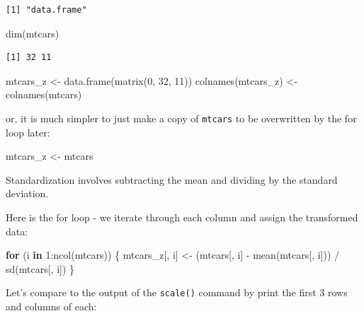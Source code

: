 \documentclass[
]{book}
\newenvironment{Shaded}{\begin{snugshade}}{\end{snugshade}}
\newcommand{\ControlFlowTok}[1]{\textcolor[rgb]{0.13,0.29,0.53}{\textbf{#1}}}
\newcommand{\DecValTok}[1]{\textcolor[rgb]{0.00,0.00,0.81}{#1}}
\newcommand{\FunctionTok}[1]{\textcolor[rgb]{0.00,0.00,0.00}{#1}}
\newcommand{\NormalTok}[1]{#1}
\newcommand{\OtherTok}[1]{\textcolor[rgb]{0.56,0.35,0.01}{#1}}
\newcommand{\SpecialCharTok}[1]{\textcolor[rgb]{0.00,0.00,0.00}{#1}}
\begin{document}
\begin{verbatim}
[1] "data.frame"
\end{verbatim}

\begin{Shaded}
\begin{Highlighting}[]
\FunctionTok{dim}\NormalTok{(mtcars)}
\end{Highlighting}
\end{Shaded}

\begin{verbatim}
[1] 32 11
\end{verbatim}

\begin{Shaded}
\begin{Highlighting}[]
\NormalTok{mtcars\_z }\OtherTok{\textless{}{-}} \FunctionTok{data.frame}\NormalTok{(}\FunctionTok{matrix}\NormalTok{(}\DecValTok{0}\NormalTok{, }\DecValTok{32}\NormalTok{, }\DecValTok{11}\NormalTok{))}
\FunctionTok{colnames}\NormalTok{(mtcars\_z) }\OtherTok{\textless{}{-}} \FunctionTok{colnames}\NormalTok{(mtcars)}
\end{Highlighting}
\end{Shaded}

or, it is much simpler to just make a copy of \texttt{mtcars} to be overwritten by the for loop later:

\begin{Shaded}
\begin{Highlighting}[]
\NormalTok{mtcars\_z }\OtherTok{\textless{}{-}}\NormalTok{ mtcars}
\end{Highlighting}
\end{Shaded}

Standardization involves subtracting the mean and dividing by the standard deviation.

Here is the for loop - we iterate through each column and assign the transformed data:

\begin{Shaded}
\begin{Highlighting}[]
\ControlFlowTok{for}\NormalTok{ (i }\ControlFlowTok{in} \DecValTok{1}\SpecialCharTok{:}\FunctionTok{ncol}\NormalTok{(mtcars)) \{}
\NormalTok{  mtcars\_z[, i] }\OtherTok{\textless{}{-}}\NormalTok{ (mtcars[, i] }\SpecialCharTok{{-}} \FunctionTok{mean}\NormalTok{(mtcars[, i])) }\SpecialCharTok{/} \FunctionTok{sd}\NormalTok{(mtcars[, i])}
\NormalTok{\}}
\end{Highlighting}
\end{Shaded}

Let's compare to the output of the \texttt{scale()} command by print the first 3 rows and columns of each:
\end{document}
